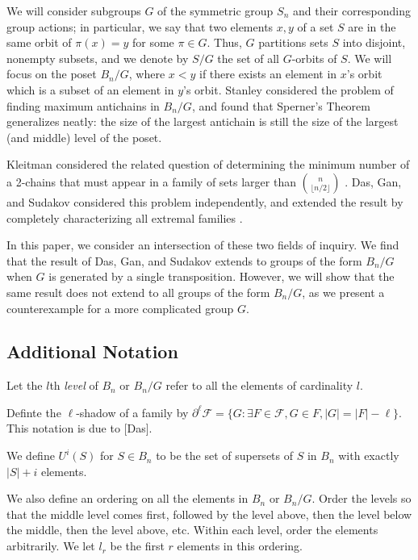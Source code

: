 \documentclass[12pt]{article}
\theoremstyle{plain}
\theoremstyle{definition}
\theoremstyle{remark}
\newcommand{\F}{\mathcal{F}}
\begin{document}
We will consider subgroups $G$ of the symmetric group $S_n$ and their corresponding group actions; in particular, we say that two elements $x, y$ of a set $S$ are in the same orbit of $\pi(x) = y$ for some $\pi \in G$. Thus, $G$ partitions sets $S$ into disjoint, nonempty subsets, and we denote by $S / G$ the set of all $G$-orbits of $S$. We will focus on the poset $B_n / G$, where $x < y$ if there exists an element in $x$'s orbit which is a subset of an element in $y$'s orbit. Stanley considered the problem of finding maximum antichains in $B_n / G$, and found that Sperner's Theorem generalizes neatly: the size of the largest antichain is still the size of the largest (and middle) level of the poset.

Kleitman considered the related question of determining the minimum number of a 2-chains that must appear in a family of sets larger than $\binom{n}{\lfloor n/2 \rfloor}$ \cite{Kleitman}. Das, Gan, and Sudakov considered this problem independently, and extended the result by completely characterizing all extremal families \cite{Sudakov}. 

In this paper, we consider an intersection of these two fields of inquiry. We find that the result of Das, Gan, and Sudakov extends to groups of the form $B_n / G$ when $G$ is generated by a single transposition. However, we will show that the same result does not extend to all groups of the form $B_n / G$, as we present a counterexample for a more complicated group $G$. 

\subsection{Additional Notation}

Let the $l$th \emph{level} of $B_n$ or $B_n / G$ refer to all the elements of cardinality $l$.

Definte the $\ell$-shadow of a family by $\partial^{\ell}\F = \{G: \exists F \in \F, G \in F, |G| = |F| - \ell\}$. This notation is due to [Das].

We define $U^i(S)$ for $S \in B_n$ to be the set of supersets of $S$ in $B_n$ with exactly $|S| + i$ elements.

We also define an ordering on all the elements in $B_n$ or $B_n/ G$. Order the levels so that the middle level comes first, followed by the level above, then the level below the middle, then the level above, etc. Within each level, order the elements arbitrarily. We let $l_r$ be the first $r$ elements in this ordering. 
\end{document}
